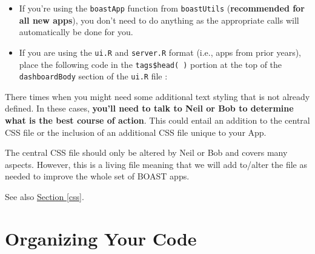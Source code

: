 \documentclass[
]{book}
\newenvironment{Shaded}{\begin{snugshade}}{\end{snugshade}}
\newcommand{\CommentTok}[1]{\textcolor[rgb]{0.56,0.35,0.01}{\textit{#1}}}
\newcommand{\DataTypeTok}[1]{\textcolor[rgb]{0.13,0.29,0.53}{#1}}
\newcommand{\DecValTok}[1]{\textcolor[rgb]{0.00,0.00,0.81}{#1}}
\newcommand{\KeywordTok}[1]{\textcolor[rgb]{0.13,0.29,0.53}{\textbf{#1}}}
\newcommand{\NormalTok}[1]{#1}
\newcommand{\OperatorTok}[1]{\textcolor[rgb]{0.81,0.36,0.00}{\textbf{#1}}}
\newcommand{\StringTok}[1]{\textcolor[rgb]{0.31,0.60,0.02}{#1}}
\providecommand{\tightlist}{%
  \setlength{\itemsep}{0pt}\setlength{\parskip}{0pt}}
\begin{document}
\begin{itemize}
\tightlist
\item
  If you're using the \texttt{boastApp} function from \texttt{boastUtils} (\textbf{recommended for all new apps}), you don't need to do anything as the appropriate calls will automatically be done for you.
\item
  If you are using the \texttt{ui.R} and \texttt{server.R} format (i.e., apps from prior years), place the following code in the \texttt{tags\$head(\ )} portion at the top of the \texttt{dashboardBody} section of the \texttt{ui.R} file :
\end{itemize}

\begin{Shaded}
\end{Shaded}

There times when you might need some additional text styling that is not already defined. In these cases, \textbf{you'll need to talk to Neil or Bob to determine what is the best course of action}. This could entail an addition to the central CSS file or the inclusion of an additional CSS file unique to your App.

The central CSS file should only be altered by Neil or Bob and covers many aspects. However, this is a living file meaning that we will add to/alter the file as needed to improve the whole set of BOAST apps.

See also \protect\hyperlink{cssb}{Section \ref{css}}.

\hypertarget{orgCodeb}{%
\section{Organizing Your Code}\label{orgCodeb}}
\end{document}
